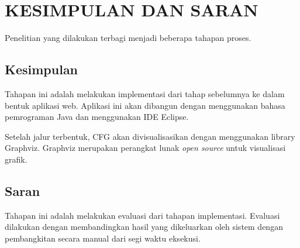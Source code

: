 \section*{KESIMPULAN DAN SARAN}

Penelitian yang dilakukan terbagi menjadi beberapa tahapan proses.
\subsection*{Kesimpulan}

Tahapan ini adalah melakukan implementasi dari tahap sebelumnya ke dalam bentuk aplikasi web. Aplikasi ini akan dibangun dengan menggunakan bahasa pemrograman Java dan menggunakan IDE Eclipse. 

Setelah jalur terbentuk, CFG akan divisualisasikan dengan menggunakan library Graphviz. Graphviz merupakan perangkat lunak \textit{open source} untuk visualisasi grafik.

\subsection*{Saran}

Tahapan ini adalah melakukan evaluasi dari tahapan implementasi. Evaluasi dilakukan dengan membandingkan hasil yang dikeluarkan oleh sistem dengan pembangkitan secara manual dari segi waktu eksekusi. 
